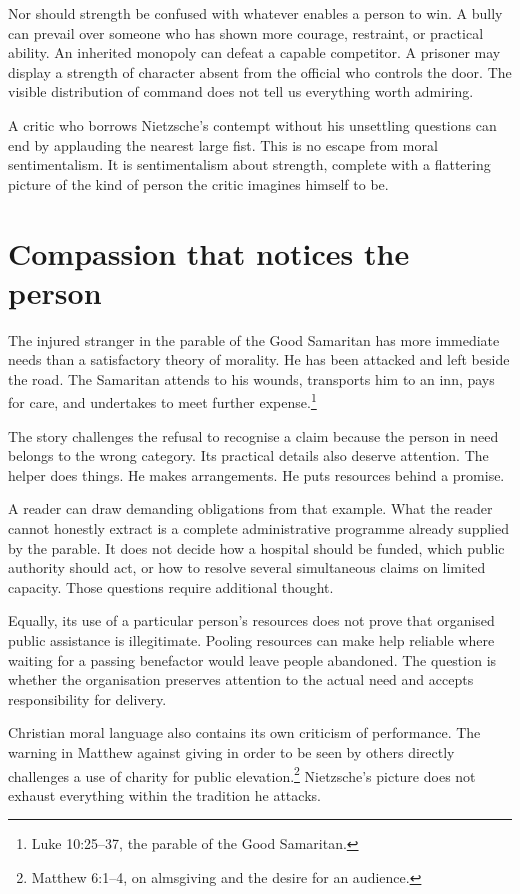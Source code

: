 \documentclass[12pt,a4paper]{book}
\begin{document}
Nor should strength be confused with whatever enables a person to win. A bully can prevail over someone who has shown more courage, restraint, or practical ability. An inherited monopoly can defeat a capable competitor. A prisoner may display a strength of character absent from the official who controls the door. The visible distribution of command does not tell us everything worth admiring.

A critic who borrows Nietzsche's contempt without his unsettling questions can end by applauding the nearest large fist. This is no escape from moral sentimentalism. It is sentimentalism about strength, complete with a flattering picture of the kind of person the critic imagines himself to be.

\section*{Compassion that notices the person}

The injured stranger in the parable of the Good Samaritan has more immediate needs than a satisfactory theory of morality. He has been attacked and left beside the road. The Samaritan attends to his wounds, transports him to an inn, pays for care, and undertakes to meet further expense.\footnote{Luke 10:25--37, the parable of the Good Samaritan.}

The story challenges the refusal to recognise a claim because the person in need belongs to the wrong category. Its practical details also deserve attention. The helper does things. He makes arrangements. He puts resources behind a promise.

A reader can draw demanding obligations from that example. What the reader cannot honestly extract is a complete administrative programme already supplied by the parable. It does not decide how a hospital should be funded, which public authority should act, or how to resolve several simultaneous claims on limited capacity. Those questions require additional thought.

Equally, its use of a particular person's resources does not prove that organised public assistance is illegitimate. Pooling resources can make help reliable where waiting for a passing benefactor would leave people abandoned. The question is whether the organisation preserves attention to the actual need and accepts responsibility for delivery.

Christian moral language also contains its own criticism of performance. The warning in Matthew against giving in order to be seen by others directly challenges a use of charity for public elevation.\footnote{Matthew 6:1--4, on almsgiving and the desire for an audience.} Nietzsche's picture does not exhaust everything within the tradition he attacks.
\end{document}
